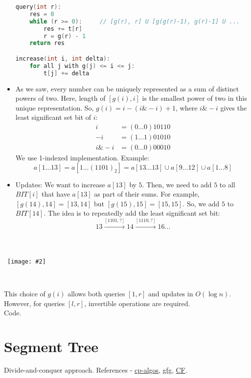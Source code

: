 \documentclass{article}
\newcommand{\image}[2]{\
    \begin{center}\
        \texttt{[image: \#2]}\
    \end{center}\
}
\begin{document}
\begin{sloppypar}
\begin{itemize}
\begin{lstlisting}[language=C++]
query(int r):
    res = 0
    while (r >= 0):     // [g(r), r] U [g(g(r)-1), g(r)-1] U ...
        res += t[r]
        r = g(r) - 1
    return res

increase(int i, int delta):
    for all j with g(j) <= i <= j:
        t[j] += delta
\end{lstlisting}

        \item As we saw, every number can be uniquely represented as a sum of distinct powers of two. Here, length of $[g(i),i]$ is the smallest power of two in this unique representation. So, $g(i) = i-(i \& -i)+1$, where $i \& -i$ gives the least significant set bit of $i$:
        \begin{align*}
            i &= (0\dots 0)10110\\
            -i &= (1\dots 1)01010\\
            i \& -i &= (0\dots 0)00010
        \end{align*}
        We use 1-indexed implementation. Example:
        $$a[1\dots 13] = a[1\dots (1101)_2] = a[13\dots 13]\cup a[9\dots 12]\cup a[1\dots 8]$$

        \item Updates: We want to increase $a[13]$ by $5$. Then, we need to add $5$ to all $BIT[i]$ that have $a[13]$ as part of their sums. For example, $[g(14),14]=[13,14]$ but $[g(15),15]=[15,15]$. So, we add $5$ to $BIT[14]$. The idea is to repeatedly add the least significant set bit:
        $$13 \xrightarrow[]{[1101,?]} 14 \xrightarrow[]{[1110,?]} 16 \dots$$
    \end{itemize}

    \image{0.6}{../images/bit.png}

    \noindent This choice of $g(i)$ allows both queries $[1,r]$ and updates in $O(\log n)$. However, for queries $[l,r]$, invertible operations are required.\\
    Code.

    \section{Segment Tree}

    Divide-and-conquer approach. References - \href{https://cp-algorithms.com/data_structures/segment_tree.html}{cp-algos}, \href{https://www.geeksforgeeks.org/segment-tree-data-structure/}{gfg}, \href{https://codeforces.com/blog/entry/18051}{CF}.


\end{sloppypar}
\end{document}
